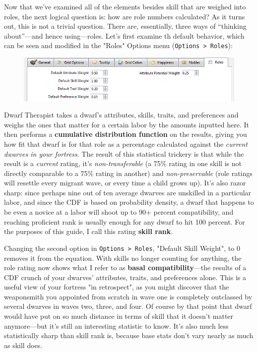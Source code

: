 \documentclass[]{article}
\begin{document}
Now that we've examined all of the elements besides skill that are weighed into roles, the next logical
question is: how are role numbers calculated? As it turns out, this is not a trivial question.
There are, essentially, three ways of ``thinking about''---and hence using---roles. Let's first examine
th default behavior, which can be seen and modified in the "Roles" Options menu (\texttt{Options >
Roles}):
\begin{figure}[h!] \centering
\vspace{-5pt}
\includegraphics[scale=.865]{Sec3Fig1}
\vspace{-5pt}
\end{figure}

Dwarf Therapist takes a dwarf's attributes, skills, traits, and preferences and weighs the ones that
matter for a certain labor by the amounts inputted here. It then performs a \textbf{cumulative
distribution function} on the results, giving you how fit that dwarf is for that role as a percentage
calculated against the \emph{current dwarves in your fortress}. The result of this statistical trickery
is that while the result is a \emph{current} rating, it's \emph{non-transferable} (a 75\% rating in one
skill is not directly comparable to a 75\% rating in another) and \emph{non-preservable} (role ratings
will resettle every migrant wave, or every time a child grows up). It's also razor sharp: since perhaps
nine out of ten average dwarves are unskilled in a particular labor, and since the CDF is based on
probability density, a dwarf that happens to be even a novice at a labor will shoot up to 90+ percent
compatibility, and reaching proficient rank is usually enough for any dwarf to hit 100 percent. For the
purposes of this guide, I call this rating \textbf{skill rank}.

Changing the second option in \texttt{Options > Roles}, "Default Skill Weight", to 0 removes it from the
equation. With skills no longer counting for anything, the role rating now shows what I refer to as
\textbf{basal compatibility}---the results of a CDF crunch of your dwarves' attributes, traits, and
preferences alone. This is a useful view of your fortress "in retrospect", as you might discover that the
weaponsmith you appointed from scratch in wave one is completely outclassed by several dwarves in waves
two, three, and four. Of course by that point that dwarf would have put on so much distance in terms of
skill that it doesn't matter anymore---but it's still an interesting statistic to know. It's also much
less statistically sharp than skill rank is, because base stats don't vary nearly as much as skill does.
\end{document}
